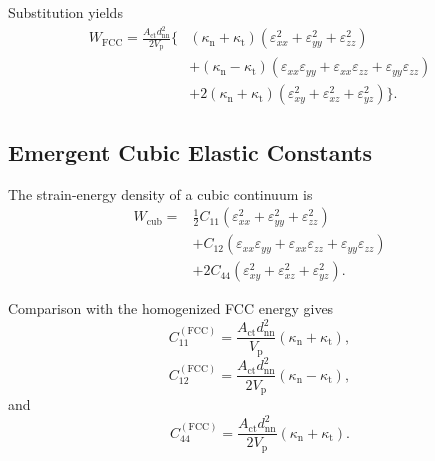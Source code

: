Substitution yields
\begin{equation}
\begin{aligned}
    W_{\mathrm{FCC}} = \frac{ A_{\mathrm{ct}}d_{\mathrm{nn}}^2 }{ 2V_{\mathrm{p}} } \Bigg\{ & \left( \kappa_{\mathrm{n}} + \kappa_{\mathrm{t}} \right) \left( \varepsilon_{xx}^2 + \varepsilon_{yy}^2 + \varepsilon_{zz}^2 \right) \\
    &+ \left( \kappa_{\mathrm{n}} - \kappa_{\mathrm{t}} \right) \left( \varepsilon_{xx}\varepsilon_{yy} + \varepsilon_{xx}\varepsilon_{zz} + \varepsilon_{yy}\varepsilon_{zz} \right) \\
    &+ 2 \left( \kappa_{\mathrm{n}} + \kappa_{\mathrm{t}} \right) \left( \varepsilon_{xy}^2 + \varepsilon_{xz}^2 + \varepsilon_{yz}^2 \right) \Bigg\}.
\end{aligned}
\end{equation}

\subsection{Emergent Cubic Elastic Constants}

The strain-energy density of a cubic continuum is
\begin{equation}
\begin{aligned}
    W_{\mathrm{cub}} ={}& \frac{1}{2} C_{11} \left( \varepsilon_{xx}^2 + \varepsilon_{yy}^2 + \varepsilon_{zz}^2 \right) \\
    &+ C_{12} \left( \varepsilon_{xx}\varepsilon_{yy} + \varepsilon_{xx}\varepsilon_{zz} + \varepsilon_{yy}\varepsilon_{zz} \right) \\
    &+ 2C_{44} \left( \varepsilon_{xy}^2 + \varepsilon_{xz}^2 + \varepsilon_{yz}^2 \right).
\end{aligned}
\end{equation}

Comparison with the homogenized FCC energy gives
\begin{equation}
    \boxed{ C_{11}^{(\mathrm{FCC})} = \frac{ A_{\mathrm{ct}}d_{\mathrm{nn}}^2 }{ V_{\mathrm{p}} } \left( \kappa_{\mathrm{n}} + \kappa_{\mathrm{t}} \right) },
\end{equation}
\begin{equation}
    \boxed{ C_{12}^{(\mathrm{FCC})} = \frac{ A_{\mathrm{ct}}d_{\mathrm{nn}}^2 }{ 2V_{\mathrm{p}} } \left( \kappa_{\mathrm{n}} - \kappa_{\mathrm{t}} \right) },
\end{equation}
and
\begin{equation}
    \boxed{ C_{44}^{(\mathrm{FCC})} = \frac{ A_{\mathrm{ct}}d_{\mathrm{nn}}^2 }{ 2V_{\mathrm{p}} } \left( \kappa_{\mathrm{n}} + \kappa_{\mathrm{t}} \right). }
\end{equation}

